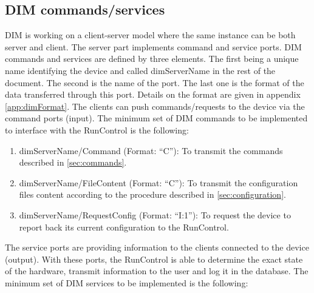 \documentclass[a4paper]{article}
\begin{document}
\subsection{DIM commands/services} \label{sec:DIM}
DIM is working on a client-server model where the same instance can be both server and client.
The server part implements command and service ports. DIM commands and
services are defined by three elements. The first being a unique name
identifying the device and called dimServerName in the rest of the document.
The second is the name of the port. The last one is the format of the data
transferred through this port. Details on the format are given in appendix
\ref{app:dimFormat}. The clients can push commands/requests to the device via
the command ports (input). The minimum set of DIM commands to be implemented to
interface with the RunControl is the following:
\begin{enumerate}[label=\textbf{CMD.\arabic*}]
	\item \label{cmd:command} dimServerName/Command (Format: ``C''): To transmit
	the commands described in \ref{sec:commands}.
	\item \label{cmd:fileContent} dimServerName/FileContent (Format: ``C''): To
	transmit the configuration files content according to the procedure described
	in \ref{sec:configuration}.
	\item \label{cmd:report} dimServerName/RequestConfig (Format: ``I:1''): To request the device to
	report back its current configuration to the RunControl.
\end{enumerate}
The service ports are providing information to the clients connected to the device (output).
With these ports, the RunControl is able to determine the exact state of the hardware,
transmit information to the user and log it in the database. The minimum set of DIM services to
be implemented is the following:
\end{document}
